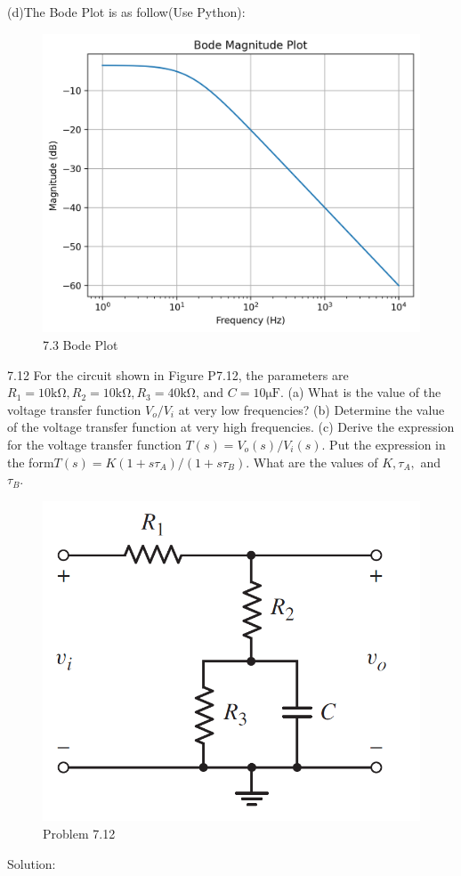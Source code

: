 \documentclass[a4paper,11pt,UTF8]{article}
\begin{document}
(d)The Bode Plot is as follow(Use Python):
\begin{figure}[H]
	\centering
	\includegraphics[scale=0.7]{MD7.3_1}
	\caption{7.3 Bode Plot}
\end{figure}
7.12 For the circuit shown in Figure P7.12, the parameters are $R_1 = 10 \mathrm{k\Omega},
R_2 = 10 \mathrm{k\Omega}, R_3 = 40 \mathrm{k\Omega}$, and $C = 10\mathrm{\mu F}$. (a) What is the value of the voltage
transfer function $V_o/V_i$ at very low frequencies? (b) Determine the value of the voltage transfer function at very high frequencies. (c) Derive the expression for the voltage transfer function $T (s) = V_o(s)/V_i(s)$. Put the expression in the form$ T(s) = K(1 + s\tau_A)/(1 + s\tau_B)$. What are the values
of $K, \tau_A,$ and $\tau_B$.
\begin{figure}[H]
	\centering
	\includegraphics[scale=0.25]{MD7.12}
	\caption{Problem 7.12}
\end{figure}
Solution:
\end{document}
